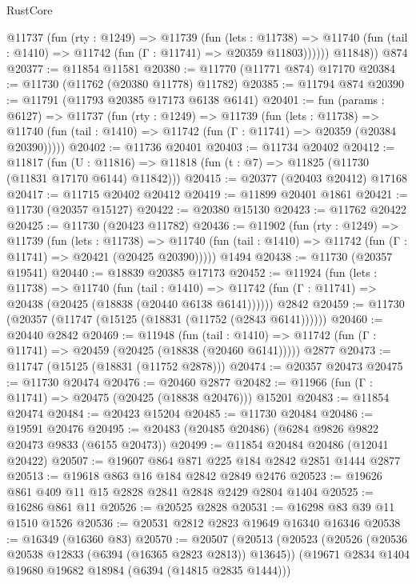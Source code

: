 \begin{lexlean}{RustCore}
\begin{coremodule}
          @11737
            (fun (rty : @1249) =>
            @11739
              (fun (lets : @11738) =>
              @11740 (fun (tail : @1410) => @11742 (fun (Γ : @11741) => @20359 @11803))))))
        @11848))
    @874
@20377 := @11854 @11581
@20380 := @11770 (@11771 @874) @17170
@20384 := @11730 (@11762 (@20380 @11778) @11782)
@20385 := @11794 @874
@20390 := @11791 (@11793 @20385 @17173 @6138 @6141)
@20401 := fun (params : @6127) =>
  @11737
    (fun (rty : @1249) =>
    @11739
      (fun (lets : @11738) =>
      @11740 (fun (tail : @1410) => @11742 (fun (Γ : @11741) => @20359 (@20384 @20390)))))
@20402 := @11736 @20401
@20403 := @11734 @20402
@20412 := @11817
    (fun (U : @11816) => @11818 (fun (t : @7) => @11825 (@11730 (@11831 @17170 @6144) @11842)))
@20415 := @20377 (@20403 @20412) @17168
@20417 := @11715 @20402 @20412
@20419 := @11899 @20401 @1861
@20421 := @11730 (@20357 @15127)
@20422 := @20380 @15130
@20423 := @11762 @20422
@20425 := @11730 (@20423 @11782)
@20436 := @11902
    (fun (rty : @1249) =>
    @11739
      (fun (lets : @11738) =>
      @11740 (fun (tail : @1410) => @11742 (fun (Γ : @11741) => @20421 (@20425 @20390)))))
    @1494
@20438 := @11730 (@20357 @19541)
@20440 := @18839 @20385 @17173
@20452 := @11924
    (fun (lets : @11738) =>
    @11740
      (fun (tail : @1410) =>
      @11742 (fun (Γ : @11741) => @20438 (@20425 (@18838 (@20440 @6138 @6141))))))
    @2842
@20459 := @11730 (@20357 (@11747 (@15125 (@18831 (@11752 (@2843 @6141))))))
@20460 := @20440 @2842
@20469 := @11948
    (fun (tail : @1410) => @11742 (fun (Γ : @11741) => @20459 (@20425 (@18838 (@20460 @6141)))))
    @2877
@20473 := @11747 (@15125 (@18831 (@11752 @2878)))
@20474 := @20357 @20473
@20475 := @11730 @20474
@20476 := @20460 @2877
@20482 := @11966 (fun (Γ : @11741) => @20475 (@20425 (@18838 @20476))) @15201
@20483 := @11854 @20474
@20484 := @20423 @15204
@20485 := @11730 @20484
@20486 := @19591 @20476
@20495 := @20483 (@20485 @20486) (@6284 @9826 @9822 @20473 @9833 (@6155 @20473))
@20499 := @11854 @20484 @20486 (@12041 @20422)
@20507 := @19607 @864 @871 @225 @184 @2842 @2851 @1444 @2877
@20513 := @19618 @863 @16 @184 @2842 @2849 @2476
@20523 := @19626 @861 @409 @11 @15 @2828 @2841 @2848 @2429 @2804 @1404
@20525 := @16286 @861 @11
@20526 := @20525 @2828
@20531 := @16298 @83 @39 @11 @1510 @1526
@20536 := @20531 @2812 @2823 @19649 @16340 @16346
@20538 := @16349 (@16360 @83)
@20570 := @20507
    (@20513
      (@20523
        (@20526 (@20536 @20538 @12833 (@6394 (@16365 @2823 @2813)) @13645))
        (@19671 @2834 @1404 @19680 @19682 @18984 (@6394 (@14815 @2835 @1444)))

\end{coremodule}
\end{lexlean}
